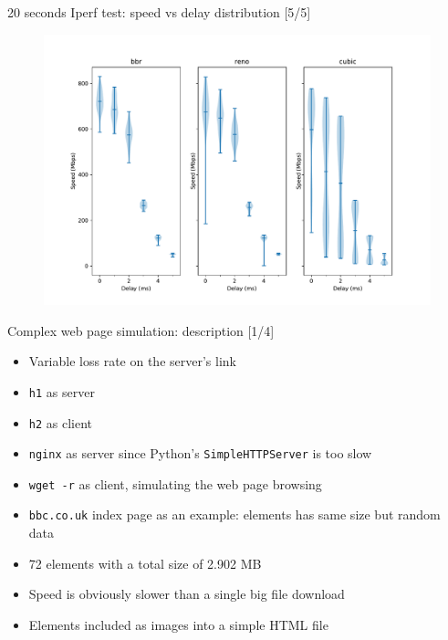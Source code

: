 \documentclass[13pt,aspectratio=43]{beamer}
\begin{document}
\begin{frame}{20 seconds Iperf test: speed vs delay distribution [5/5]}
  \begin{figure}
	  \includegraphics[width=\textwidth,height=\textheight,keepaspectratio]{../iperf_test_delay/violinplot.pdf}
  \end{figure}
\end{frame}


\begin{frame}{Complex web page simulation: description [1/4]}
	\begin{itemize}

		\item Variable loss rate on the server's link
		\item \texttt{h1} as server
		\item \texttt{h2} as client
		\item \texttt{nginx} as server since Python's \texttt{SimpleHTTPServer} is too slow
		\item \texttt{wget -r} as client, simulating the web page browsing
		\item \texttt{bbc.co.uk} index page as an example: elements has same size but random data
		\item 72 elements with a total size of 2.902 MB
		\item Speed is obviously slower than a single big file download
		\item Elements included as images into a simple HTML file
	\end{itemize}
\end{frame}
\end{document}
